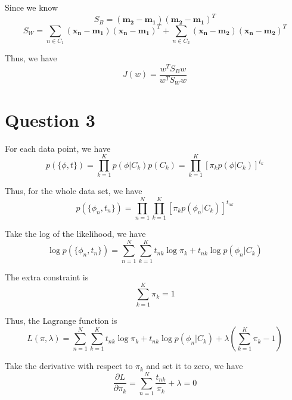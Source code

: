 \documentclass[a4paper,12pt]{article}
\newcommand{\pard}[2]{\frac{\partial #1}{\partial #2}}
\begin{document}
Since we know
\begin{equation*}
	S_B = (\mathbf{m_2} - \mathbf{m_1}) (\mathbf{m_2} - \mathbf{m_1})^T
\end{equation*}
\begin{equation*}
	S_W = \sum_{n \in C_1} (\mathbf{x_n} - \mathbf{m_1}) (\mathbf{x_n} - \mathbf{m_1})^T + \sum_{n \in C_2} (\mathbf{x_n} - \mathbf{m_2}) (\mathbf{x_n} - \mathbf{m_2})^T
\end{equation*}

Thus, we have
\begin{equation*}
	J(w) = \frac{w^T S_B w}{w^T S_W w}
\end{equation*}

\section*{Question 3}

For each data point, we have
\begin{equation*}
	p(\{\phi, t\}) = \prod_{k=1}^K p(\phi|C_k) p(C_k) = \prod_{k=1}^K [\pi_k p(\phi|C_k)]^{t_k}
\end{equation*}

Thus, for the whole data set, we have
\begin{equation*}
	p(\{\phi_n, t_n\}) = \prod_{n=1}^N \prod_{k=1}^K [\pi_k p(\phi_n|C_k)]^{t_{nk}}
\end{equation*}

Take the log of the likelihood, we have
\begin{equation*}
	\log p(\{\phi_n, t_n\}) = \sum_{n=1}^N \sum_{k=1}^K t_{nk} \log \pi_k + t_{nk} \log p(\phi_n|C_k)
\end{equation*}

The extra constraint is
\begin{equation*}
	\sum_{k=1}^K \pi_k = 1
\end{equation*}

Thus, the Lagrange function is
\begin{equation*}
	L(\pi, \lambda) = \sum_{n=1}^N \sum_{k=1}^K t_{nk} \log \pi_k + t_{nk} \log p(\phi_n|C_k) + \lambda \left(\sum_{k=1}^K \pi_k - 1\right)
\end{equation*}

Take the derivative with respect to $\pi_k$ and set it to zero, we have
\begin{equation*}
	\pard{L}{\pi_k} = \sum_{n=1}^N \frac{t_{nk}}{\pi_k} + \lambda = 0
\end{equation*}
\end{document}
